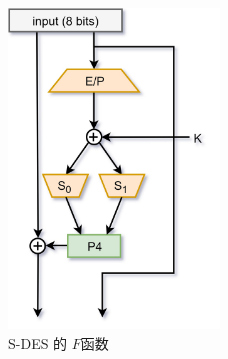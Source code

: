 \documentclass{ctexart}
\begin{document}
    \begin{figure}[ht!]
        \centering
        \includegraphics[width=0.5\textwidth]{s-des-fk.jpg}
        \caption{S-DES 的 $F$函数}
        \label{s-des-fk}
    \end{figure}
\end{document}
